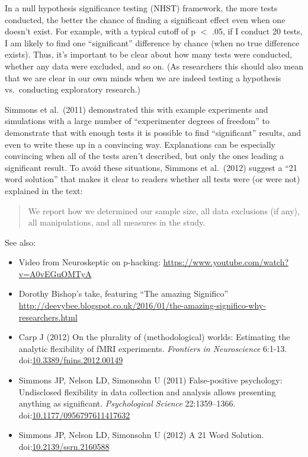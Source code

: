 \documentclass[letterpaper,oneside,11pt,article, portrait]{memoir}
\newcommand{\doi}[1]{doi:\href{http://dx.doi.org/#1}{#1}}
\newcommand{\journal}[1]{\textit{#1}} 			%
\begin{document}
In a null hypothesis significance testing (NHST) framework, the more tests conducted, the better the chance of finding a significant effect even when one doesn't exist. For example, with a typical cutoff of p $<$ .05, if I conduct 20 tests, I am likely to find one ``significant'' difference by chance (when no true difference exists). Thus, it's important to be clear about how many tests were conducted, whether any data were excluded, and so on. (As researchers this should also mean that we are clear in our own minds when we are indeed testing a hypothesis vs.\ conducting exploratory research.)

Simmons et al.\ (2011) demonstrated this with example experiments and simulations with a large number of ``experimenter degrees of freedom'' to demonstrate that with enough tests it is possible to find ``significant'' results, and even to write these up in a convincing way. Explanations can be especially convincing when all of the tests aren't described, but only the ones leading a significant result. To avoid these situations, Simmons et al.\ (2012) suggest a ``21 word solution'' that makes it clear to readers whether all tests were (or were not) explained in the text:

\begin{quote}
We report how we determined our sample size, all data exclusions (if any), all manipulations, and all measures in the study.
\end{quote}

\vspace{1em} \noindent See also:

\begin{itemize}
\item Video from Neuroskeptic on p-hacking: \url{https://www.youtube.com/watch?v=A0vEGuOMTyA} 
\item Dorothy Bishop's take, featuring ``The amazing Significo'' \url{http://deevybee.blogspot.co.uk/2016/01/the-amazing-significo-why-researchers.html}
\item Carp J (2012) On the plurality of (methodological) worlds: Estimating the analytic flexibility of fMRI experiments. \journal{Frontiers in Neuroscience} 6:1-13. \doi{10.3389/fnins.2012.00149}
\item Simmons JP, Nelson LD, Simonsohn U (2011) False-positive psychology: Undisclosed flexibility in data collection and analysis allows presenting anything as significant. \journal{Psychological Science} 22:1359--1366. \doi{10.1177/0956797611417632}
\item Simmons JP,  Nelson LD, Simonsohn U (2012) A 21 Word Solution. \doi{10.2139/ssrn.2160588}
\end{itemize}
\end{document}
